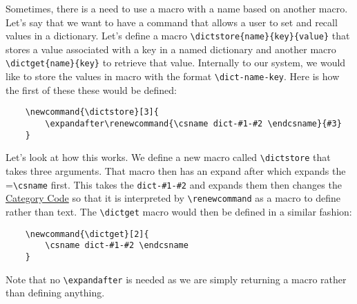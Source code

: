 Sometimes, there is a need to use a macro with a name based on another macro. Let's say that we want to have a command that allows a user to set and recall values in a dictionary. Let's define a macro \verb=\dictstore{name}{key}{value}= that stores a value associated with a key in a named dictionary and another macro \verb=\dictget{name}{key}= to retrieve that value. Internally to our system, we would like to store the values in macro with the format \verb=\dict-name-key=. Here is how the first of these these would be defined:
\begin{verbatim}
    \newcommand{\dictstore}[3]{
        \expandafter\renewcommand{\csname dict-#1-#2 \endcsname}{#3}
    }
\end{verbatim}
Let's look at how this works. We define a new macro called \verb=\dictstore= that takes three arguments. That macro then has an expand after which expands the =\verb=\csname= first. This takes the \verb=dict-#1-#2= and expands them then changes the \hyperref[section:programming/advancedFeatures/catcodes]{Category Code} so that it is interpreted by \verb=\renewcommand= as a macro to define rather than text. The \verb=\dictget= macro would then be defined in a similar fashion:
\begin{verbatim}
    \newcommand{\dictget}[2]{
        \csname dict-#1-#2 \endcsname
    }
\end{verbatim}
Note that no \verb=\expandafter= is needed as we are simply returning a macro rather than defining anything.
